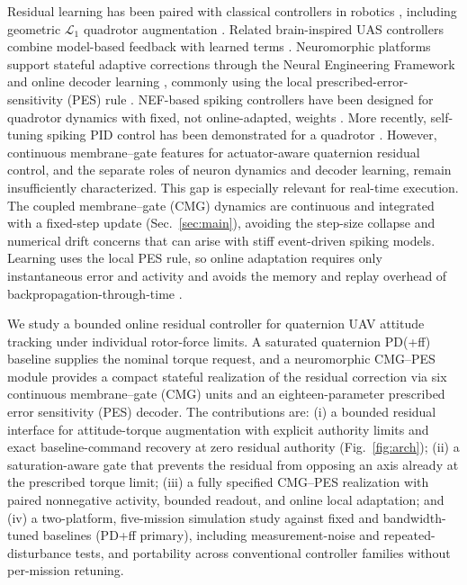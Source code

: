 \documentclass[letterpaper, 10 pt, conference]{ieeeconf}
\begin{document}
Residual learning has been paired with classical controllers in robotics \cite{johannink2019}, including geometric $\mathcal L_1$ quadrotor augmentation \cite{wu2025l1quad}. Related brain-inspired UAS controllers combine model-based feedback with learned terms \cite{rubioscola2023limbic,rubioscola2021mambo}. Neuromorphic platforms support stateful adaptive corrections through the Neural Engineering Framework and online decoder learning \cite{eliasmith2004neuraleng,bekolay2014nengo}, commonly using the local prescribed-error-sensitivity (PES) rule \cite{voelker2015pes}. NEF-based spiking controllers have been designed for quadrotor dynamics with fixed, not online-adapted, weights \cite{garciaalcantara2024snnuas}. More recently, self-tuning spiking PID control has been demonstrated for a quadrotor \cite{olivares2026selftuning}. However, continuous membrane--gate features for actuator-aware quaternion residual control, and the separate roles of neuron dynamics and decoder learning, remain insufficiently characterized.
%
This gap is especially relevant for real-time execution. The coupled membrane--gate (CMG) dynamics are continuous and integrated with a fixed-step update (Sec.~\ref{sec:main}), avoiding the step-size collapse and numerical drift concerns that can arise with stiff event-driven spiking models. Learning uses the local PES rule, so online adaptation requires only instantaneous error and activity and avoids the memory and replay overhead of backpropagation-through-time \cite{voelker2015pes,bellec2020eprop}.

We study a bounded online residual controller for quaternion UAV attitude tracking under individual rotor-force limits. A saturated quaternion PD(+ff) baseline supplies the nominal torque request, and a neuromorphic CMG--PES module provides a compact stateful realization of the residual correction via six continuous membrane--gate (CMG) units and an eighteen-parameter prescribed error sensitivity (PES) decoder.
The contributions are: (i) a bounded residual interface for attitude-torque augmentation with explicit authority limits and exact baseline-command recovery at zero residual authority (Fig.~\ref{fig:arch}); (ii) a saturation-aware gate that prevents the residual from opposing an axis already at the prescribed torque limit; (iii) a fully specified CMG--PES realization with paired nonnegative activity, bounded readout, and online local adaptation; and (iv) a two-platform, five-mission simulation study against fixed and bandwidth-tuned baselines (PD+ff primary), including measurement-noise and repeated-disturbance tests, and portability across conventional controller families without per-mission retuning.
\end{document}
